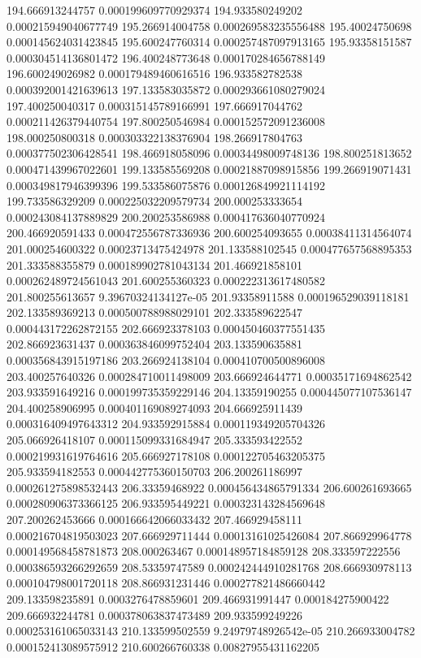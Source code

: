 {194.666913244757 0.000199609770929374
194.933580249202 0.000215949040677749
195.266914004758 0.000269583235556488
195.40024750698 0.000145624031423845
195.600247760314 0.000257487097913165
195.93358151587 0.000304514136801472
196.400248773648 0.000170284656788149
196.600249026982 0.000179489460616516
196.933582782538 0.000392001421639613
197.133583035872 0.000293661080279024
197.400250040317 0.000315145789166991
197.666917044762 0.000211426379440754
197.800250546984 0.000152572091236008
198.000250800318 0.000303322138376904
198.266917804763 0.000377502306428541
198.466918058096 0.00034498009748136
198.800251813652 0.000471439967022601
199.133585569208 0.00021887098915856
199.266919071431 0.000349817946399396
199.533586075876 0.000126849921114192
199.733586329209 0.000225032209579734
200.000253333654 0.000243084137889829
200.200253586988 0.000417636040770924
200.466920591433 0.000472556787336936
200.600254093655 0.00038411314564074
201.000254600322 0.00023713475424978
201.133588102545 0.000477657568895353
201.333588355879 0.000189902781043134
201.466921858101 0.000262489724561043
201.600255360323 0.000222313617480582
201.800255613657 9.39670324134127e-05
201.93358911588 0.000196529039118181
202.133589369213 0.000500788988029101
202.333589622547 0.000443172262872155
202.666923378103 0.000450460377551435
202.866923631437 0.000363846099752404
203.133590635881 0.000356843915197186
203.266924138104 0.000410700500896008
203.400257640326 0.000284710011498009
203.666924644771 0.00035171694862542
203.933591649216 0.000199735359229146
204.13359190255 0.000445077107536147
204.400258906995 0.000401169089274093
204.666925911439 0.000316409497643312
204.933592915884 0.000119349205704326
205.066926418107 0.000115099331684947
205.333593422552 0.000219931619764616
205.666927178108 0.000122705463205375
205.933594182553 0.000442775360150703
206.200261186997 0.000261275898532443
206.33359468922 0.000456434865791334
206.600261693665 0.000280906373366125
206.933595449221 0.000323143284569648
207.200262453666 0.000166642066033432
207.466929458111 0.000216704819503023
207.666929711444 0.00013161025426084
207.866929964778 0.000149568458781873
208.000263467 0.000148957184859128
208.333597222556 0.000386593266292659
208.53359747589 0.000242444910281768
208.666930978113 0.000104798001720118
208.866931231446 0.000277821486660442
209.133598235891 0.0003276478859601
209.466931991447 0.000184275900422
209.666932244781 0.000378063837473489
209.933599249226 0.000253161065033143
210.133599502559 9.24979748926542e-05
210.266933004782 0.000152413089575912
210.600266760338 0.00827955431162205
}
